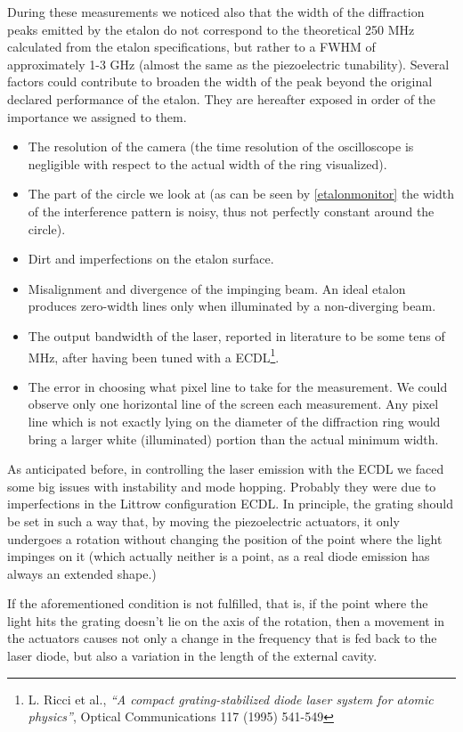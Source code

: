 \medskip
During these measurements we noticed also that the width of the diffraction peaks emitted by the etalon do not correspond to the theoretical 250 MHz calculated from the etalon specifications, but rather to a FWHM of approximately 1-3 GHz (almost the same as the piezoelectric tunability). Several factors could contribute to broaden the width of the peak beyond the original declared performance of the etalon. They are hereafter exposed in order of the importance we assigned to them.
\begin{itemize}
\item The resolution of the camera (the time resolution of the oscilloscope is negligible with respect to the actual width of the ring visualized).
\item The part of the circle we look at (as can be seen by \cref{etalonmonitor} the width of the interference pattern is noisy, thus not perfectly constant around the circle).
\item Dirt and imperfections on the etalon surface.
\item Misalignment and divergence of the impinging beam. An ideal etalon produces zero-width lines only when illuminated by a non-diverging beam.
\item The output bandwidth of the laser, reported in literature to be some tens of MHz, after having been tuned with a ECDL\footnote{L. Ricci et al., \textit{\textquotedblleft A compact grating-stabilized diode laser system for atomic physics\textquotedblright}, Optical Communications 117 (1995) 541-549}.
\item The error in choosing what pixel line to take for the measurement. We could observe only one horizontal line of the screen each measurement. Any pixel line which is not exactly lying on the diameter of the diffraction ring would bring a larger white (illuminated) portion than the actual minimum width.
\end{itemize}
As anticipated before, in controlling the laser emission with the ECDL we faced some big issues with instability and mode hopping. Probably they were due to imperfections in the Littrow configuration ECDL. In principle, the grating should be set in such a way that, by moving the piezoelectric actuators, it only undergoes a rotation without changing the position of the point where the light impinges on it (which actually neither is a point, as a real diode emission has always an extended shape.)

If the aforementioned condition is not fulfilled, that is, if the point where the light hits the grating doesn't lie on the axis of the rotation, then a movement in the actuators causes not only a change in the frequency that is fed back to the laser diode, but also a variation in the length of the external cavity.